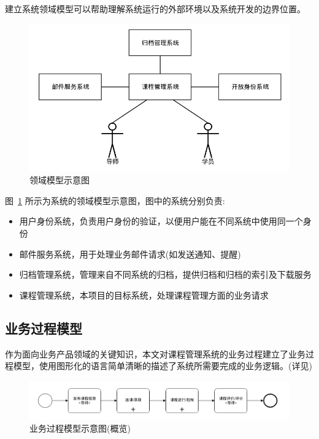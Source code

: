 建立系统领域模型可以帮助理解系统运行的外部环境以及系统开发的边界位置。

\begin{figure}[!hbp]
  \begin{center}
    \includegraphics[scale=0.5]{figures/diagram-domain-model.png}
    \caption{领域模型示意图\label{DomainModel}}
  \end{center}
\end{figure}

图~\ref{DomainModel} 所示为系统的领域模型示意图，图中的系统分别负责:

\begin{itemize}
\item 用户身份系统，负责用户身份的验证，以便用户能在不同系统中使用同一个身份
\item 邮件服务系统，用于处理业务邮件请求(如发送通知、提醒)
\item 归档管理系统，管理来自不同系统的归档，提供归档和归档的索引及下载服务
\item 课程管理系统，本项目的目标系统，处理课程管理方面的业务请求
\end{itemize}

\subsection{业务过程模型}

作为面向业务产品领域的关键知识，本文对课程管理系统的业务过程建立了业务过程模型，使用图形化的语言简单清晰的描述了系统所需要完成的业务逻辑。(详见\quad {})

\begin{figure}[!hbp]
  \begin{center}
    \includegraphics[scale=0.5]{figures/diagram-bpm-overview.png}
    \caption{业务过程模型示意图(概览)\label{BPMOverview}}
  \end{center}
\end{figure}

